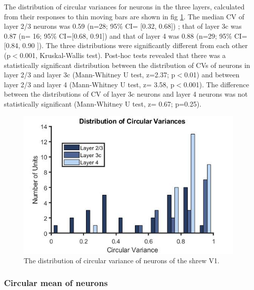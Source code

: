 The distribution of circular variances for neurons in the three layers, calculated from their responses to thin moving bars are shown in fig \ref{fig:cv}. The median CV of layer 2/3 neurons was 0.59 (n=28; 95\% CI= [0.32, 0.68]) ; that of layer 3c was  0.87 (n= 16; 95\% CI=[0.68, 0.91]) and that of layer 4 was 0.88 (n=29; 95\% CI=[0.84, 0.90 ]). The three distributions were significantly different from each other (p$<$0.001, Kruskal-Wallis test). Post-hoc tests revealed that there was a statistically significant distribution between the distribution of CVs of neurons in layer 2/3 and layer 3c (Mann-Whitney U test, z=2.37; p$<$0.01) and between layer 2/3 and layer 4 (Mann-Whitney U test, z= 3.58, p$<$0.001). The difference between the distributions of CV of layer 3c neurons and layer 4 neurons was not statistically significant (Mann-Whitney U test, z= 0.67; p=0.25). 
	\begin{figure}[H]
	
	\includegraphics[width=\linewidth]{ShrewV1/cv_lamina_2_bw.jpg}
	\caption{The distribution of circular variance of neurons of the shrew V1.}
	\label{fig:cv}
\end{figure} 

\subsubsection{Circular mean of neurons}

